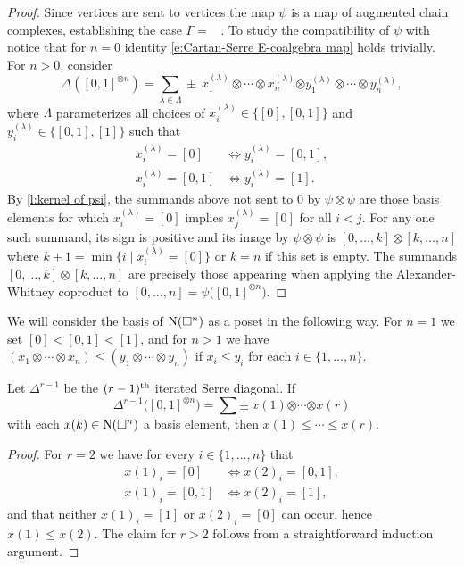 \begin{proof}
	Since vertices are sent to vertices the map $\psi$ is a map of augmented chain complexes, establishing the case $\Gamma =$ \counit \ .
	To study the compatibility of $\psi$ with \coproduct \, notice that for $n=0$ identity \eqref{e:Cartan-Serre E-coalgebra map} holds trivially.
	For $n > 0$, consider
	\[
	\Delta([0,1]^{\otimes n}) = \sum_{\lambda \in \Lambda} \pm \ x_1^{(\lambda)} \otimes \cdots \otimes x_n^{(\lambda)} \bm{\otimes} y_1^{(\lambda)} \otimes \cdots \otimes y_n^{(\lambda)},
	\]
	where $\Lambda$ parameterizes all choices of $x_i^{(\lambda)} \in \{[0], [0,1]\}$ and $y_i^{(\lambda)} \in \{[0,1], [1]\}$ such that
	\begin{align*}
	x_i^{(\lambda)} = [0]   & \iff y_i^{(\lambda)} = [0,1], \\
	x_i^{(\lambda)} = [0,1] & \iff y_i^{(\lambda)} = [1].
	\end{align*}
	By \cref{l:kernel of psi}, the summands above not sent to $0$ by $\psi \otimes \psi$ are those basis elements for which $x_i^{(\lambda)} = [0]$ implies $x_j^{(\lambda)} = [0]$ for all $i < j$.
	For any one such summand, its sign is positive and its image by $\psi \otimes \psi$ is $[0, \dots, k] \otimes [k, \dots, n]$ where $k+1 = \min \{i \mid x_i^{(\lambda)} = [0]\}$ or $k = n$ if this set is empty.
	The summands $[0, \dots, k] \otimes [k, \dots, n]$ are precisely those appearing when applying the Alexander-Whitney coproduct to $[0, \dots, n] = \psi \big( [0,1]^{\otimes n} \big)$.
\end{proof}

We will consider the basis of $\operatorname{N}(\square^n)$ as a poset in the following way.
For $n = 1$ we set $[0] < [0,1] < [1]$, and for $n > 1$ we have $(x_1 \otimes \cdots \otimes x_n) \leq (y_1 \otimes \cdots \otimes y_n)$ if $x_i \leq y_i$ for each $i \in \{1, \dots, n\}$.

\begin{lemma}
	Let $\Delta^{r-1}$ be the $(r-1)^{\mathrm{th}}$ iterated Serre diagonal.
	If
	\[
	\Delta^{r-1} \big([0,1]^{\otimes n}\big) =
	\sum \pm \ x{(1)} \bm{\otimes} \cdots \bm{\otimes} x{(r)}
	\]
	with each $x(k) \in \operatorname{N}(\square^n)$ a basis element, then $x{(1)} \leq \cdots \leq x{(r)}$.
\end{lemma}

\begin{proof}
	For $r = 2$ we have for every $i \in \{1, \dots, n\}$ that
	\begin{align*}
	x(1)_i = [0]   & \iff x(2)_i = [0,1], \\
	x(1)_i = [0,1] & \iff x(2)_i = [1],
	\end{align*}
	and that neither $x(1)_i = [1]$ or $x(2)_i = [0]$ can occur, hence $x(1) \leq x(2)$.
	The claim for $r > 2$ follows from a straightforward induction argument.
\end{proof}

